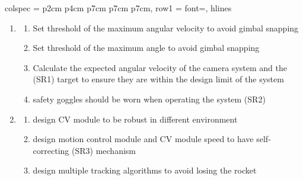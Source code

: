 \documentclass{article}
\begin{document}
\begin{table}[htbp]
{\begin{tblr}{
        colspec = {p{2cm} p{4cm} p{7cm} p{7cm} p{7cm}},
        row{1} = {font=\bfseries},
        hlines
      }
\begin{enumerate}
\begin{enumerate}
                \item Integration test before launch to ensure proper communication between all
                      modules
              \end{enumerate}
        \item \begin{enumerate}
                \item Set threshold of the maximum angular velocity to avoid gimbal snapping
                \item Set threshold of the maximum angle to avoid gimbal snapping
                \item Calculate the expected angular velocity of the camera system and the (SR1)
                      target to ensure they are within the design limit of the system
                \item safety goggles should be worn when operating the system (SR2)
              \end{enumerate}
        \item \begin{enumerate}
                \item design CV module to be robust in different environment
                \item design motion control module and CV module speed to have self-correcting (SR3)
                      mechanism
                \item design multiple tracking algorithms to avoid losing the rocket


\end{enumerate}
\end{enumerate}
\end{tblr}}
\end{table}
\end{document}
